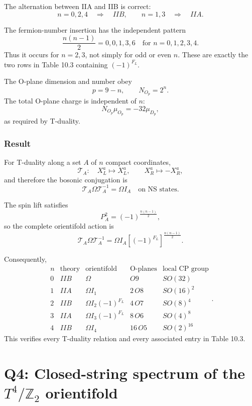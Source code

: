 \documentclass[
  10pt,
  a4paper,
  openany]{book}
\begin{document}
The alternation between IIA and IIB is correct: \[
n=0,2,4
\quad\Longrightarrow\quad
IIB,
\qquad
n=1,3
\quad\Longrightarrow\quad
IIA.
\]

The fermion-number insertion has the independent pattern \[
\frac{n(n-1)}2
=
0,0,1,3,6
\quad
\text{for }
n=0,1,2,3,4.
\] Thus it occurs for \(n=2,3\), not simply for odd or even \(n\). These
are exactly the two rows in Table 10.3 containing \((-1)^{F_L}\).

The O-plane dimension and number obey \[
p=9-n,
\qquad
N_{O_p}=2^n.
\] The total O-plane charge is independent of \(n\): \[
N_{O_p}\mu_{O_p}
=
-32\mu_{D_p},
\] as required by T-duality.

\subsubsection{Result}\label{result-23}

For T-duality along a set \(A\) of \(n\) compact coordinates, \[
\boxed{
\mathcal T_A:
\quad
X_L^a\mapsto X_L^a,
\qquad
X_R^a\mapsto-X_R^a
},
\] and therefore the bosonic conjugation is \[
\boxed{
\mathcal T_A\Omega\mathcal T_A^{-1}
=
\Omega I_A
\quad\text{on NS states}.
}
\]

The spin lift satisfies \[
\boxed{
P_A^2
=
(-1)^{\frac{n(n-1)}2}
},
\] so the complete orientifold action is \[
\boxed{
\mathcal T_A\Omega\mathcal T_A^{-1}
=
\Omega I_A
\left[(-1)^{F_L}\right]^{\frac{n(n-1)}2}
}.
\]

Consequently, \[
\boxed{
\begin{array}{c|c|c|c|c}
n
&
\text{theory}
&
\text{orientifold}
&
\text{O-planes}
&
\text{local CP group}
\\ \hline
0&IIB&\Omega&O9&SO(32)\\
1&IIA&\Omega I_1&2\,O8&SO(16)^2\\
2&IIB&\Omega I_2(-1)^{F_L}&4\,O7&SO(8)^4\\
3&IIA&\Omega I_3(-1)^{F_L}&8\,O6&SO(4)^8\\
4&IIB&\Omega I_4&16\,O5&SO(2)^{16}
\end{array}
}.
\] This verifies every T-duality relation and every associated entry in
Table 10.3.

\section{\texorpdfstring{Q4: Closed-string spectrum of the
\(T^4/\mathbb Z_2\)
orientifold}{Q4: Closed-string spectrum of the T\^{}4/\textbackslash mathbb Z\_2 orientifold}}\label{q4-closed-string-spectrum-of-the-t4mathbb-z_2-orientifold}
\end{document}

